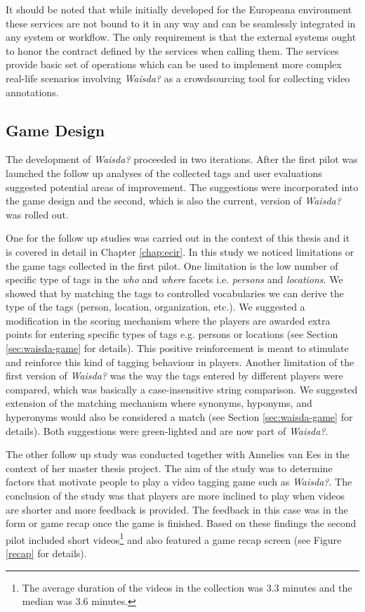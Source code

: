 It should be noted that while initially developed for the Europeana environment these services are not bound to it in any way and can be seamlessly integrated in any system or workflow. The only requirement is that the external systems ought to honor the contract defined by the services when calling them. The services provide basic set of operations which can be used to implement more complex real-life scenarios involving \textit{Waisda?} as a crowdsourcing tool for collecting video annotations.
\subsection{Game Design}\label{chap:waisda:game-design}
The development of \textit{Waisda?} proceeded in two iterations. After the first pilot was launched the follow up analyses of the collected tags \cite{Annelies,ecir} and user evaluations suggested potential areas of improvement. The suggestions were incorporated into the game design and the second, which is also the current, version of \textit{Waisda?} was rolled out.

One for the follow up studies \cite{ecir} was carried out in the context of this thesis and it is covered in detail in Chapter \ref{chap:ecir}. In this study we noticed limitations or the game tags collected in the first pilot. One limitation is the low number of specific type of tags in the \textit{who} and \textit{where} facets i.e. \textit{persons} and \textit{locations}. We showed that by matching the tags to controlled vocabularies we can derive the type of the tags (person, location, organization, etc.). We suggested a modification in the scoring mechanism where the players are awarded extra points for entering specific types of tags e.g. persons or locations (see Section \ref{sec:waisda-game} for details). This positive reinforcement is meant to stimulate and reinforce this kind of tagging behaviour in players. Another limitation of the first version of \textit{Waisda?} was the way the tags entered by different players were compared, which was basically a case-insensitive string comparison. We suggested extension of the matching mechanism where synonyms, hyponyms, and hyperonyms would also be considered a match (see Section \ref{sec:waisda-game} for details). Both suggestions were green-lighted and are now part of \textit{Waisda?}.

The other follow up study \cite{Annelies} was conducted together with Annelies van Ees in the context of her master thesis project. The aim of the study was to determine factors that motivate people to play a video tagging game such as \textit{Waisda?}. The conclusion of the study was that players are more inclined to play when videos are shorter and more feedback is provided. The feedback in this case was in the form or game recap once the game is finished. Based on these findings the second pilot included short videos\footnote{The average duration of the videos in the collection was $3.3$ minutes and the median was $3.6$ minutes.} and also featured a game recap screen (see Figure \ref{recap} for details).

